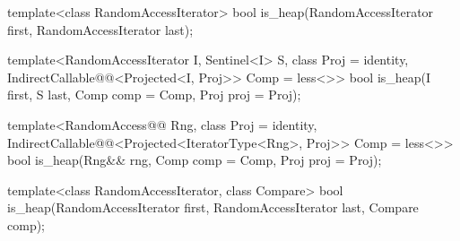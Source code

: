 %
\begin{removedblock}
\begin{itemdecl}
  template<class RandomAccessIterator>
    bool is_heap(RandomAccessIterator first, RandomAccessIterator last);
\end{itemdecl}
\end{removedblock}
\begin{addedblock}
\begin{itemdecl}
template<RandomAccessIterator I, Sentinel<I> S, class Proj = identity,
    IndirectCallable@@<Projected<I, Proj>> Comp = less<>>
  bool is_heap(I first, S last, Comp comp = Comp{}, Proj proj = Proj{});

template<RandomAccess@@ Rng, class Proj = identity,
    IndirectCallable@@<Projected<IteratorType<Rng>, Proj>> Comp = less<>>
  bool
    is_heap(Rng&& rng, Comp comp = Comp{}, Proj proj = Proj{});
\end{itemdecl}
\end{addedblock}

\begin{itemdescr}
\pnum
\returns {}
\end{itemdescr}

\begin{removedblock}
%
\begin{itemdecl}
  template<class RandomAccessIterator, class Compare>
    bool is_heap(RandomAccessIterator first, RandomAccessIterator last, Compare comp);
\end{itemdecl}

\begin{itemdescr}
\pnum
\returns {}
\end{itemdescr}
\end{removedblock}

